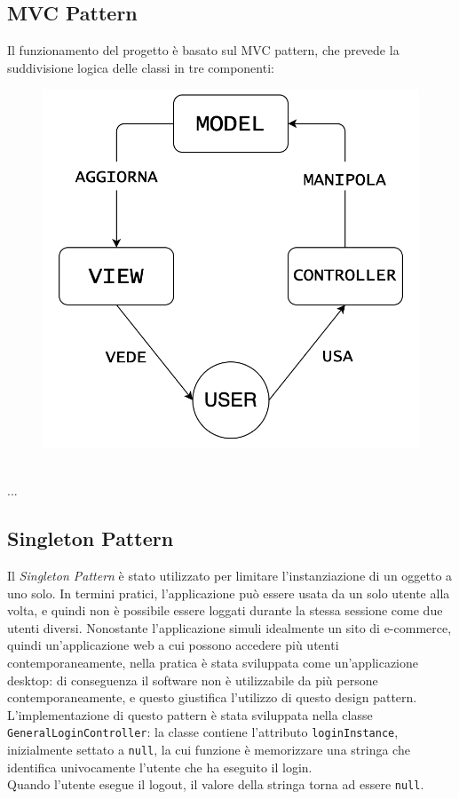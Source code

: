 \documentclass[12pt,a4paper]{article}
\begin{document}
	\subsection{MVC Pattern}
	Il funzionamento del progetto è basato sul MVC pattern, che prevede la suddivisione logica delle classi in tre componenti:
	\begin{figure}[h!]
		\centering
		\includegraphics[scale=0.4]{images/MVCPattern.png}
	\end{figure}\\
	...
	\subsection{Singleton Pattern}
	Il \textit{Singleton Pattern} è stato utilizzato per limitare l'instanziazione di un oggetto a uno solo. In termini pratici, l'applicazione può essere usata da un solo utente alla volta, e quindi non è possibile essere loggati durante la stessa sessione come due utenti diversi. Nonostante l'applicazione simuli idealmente un sito di e-commerce, quindi un'applicazione web a cui possono accedere più utenti contemporaneamente, nella pratica è stata sviluppata come un'applicazione desktop: di conseguenza il software non è utilizzabile da più persone contemporaneamente, e questo giustifica l'utilizzo di questo design pattern.
	L'implementazione di questo pattern è stata sviluppata nella classe \texttt{GeneralLoginController}: la classe contiene l'attributo \texttt{loginInstance}, inizialmente settato a \texttt{null}, la cui funzione è memorizzare una stringa che identifica univocamente l'utente che ha eseguito il login.\\
	Quando l'utente esegue il logout, il valore della stringa torna ad essere \texttt{null}.\\
\end{document}
